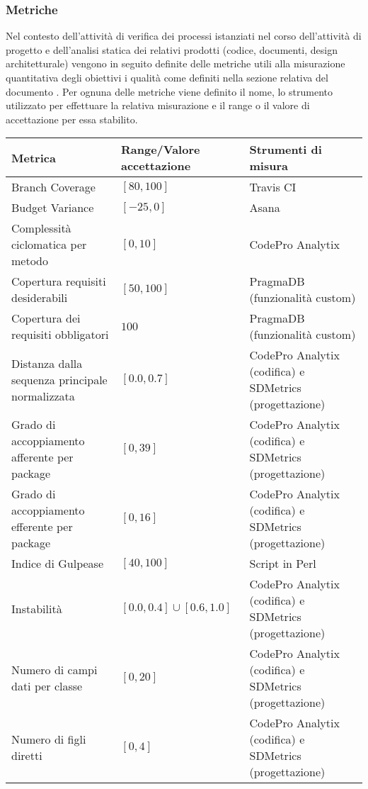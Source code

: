 \subsubsection{Metriche}
	Nel contesto dell'attività di verifica dei processi istanziati nel corso dell'attività di progetto e dell'analisi statica dei relativi prodotti (codice, documenti, design architetturale) vengono in seguito definite delle metriche utili alla misurazione quantitativa degli obiettivi i qualità come definiti nella sezione relativa del documento \PdQ.
	Per ognuna delle metriche viene definito il nome, lo strumento utilizzato per effettuare la relativa misurazione e il range o il valore di accettazione per essa stabilito.
	\begin{longtable}{|p{}|p{}|p{}|}
	\hline 
	\textbf{Metrica} & \textbf{Range/Valore accettazione} & \textbf{Strumenti di misura} \\
	\hline
	\endhead 
	Branch Coverage &  $[80, 100]$ &  Travis CI \\
	\hline 
	Budget Variance &  $[-25, 0]$ &  Asana \\
	\hline 
	Complessità ciclomatica per metodo &  $[0, 10]$ &  CodePro Analytix \\
	\hline 
	Copertura requisiti desiderabili &  $[50, 100]$ & PragmaDB (funzionalità custom) \\
	\hline 
	Copertura dei requisiti obbligatori &  $100$ & PragmaDB (funzionalità custom) \\
	\hline 
	Distanza dalla sequenza principale normalizzata &  $[0.0, 0.7]$ &  CodePro Analytix (codifica) e SDMetrics (progettazione) \\
	\hline 
	Grado di accoppiamento afferente per package &  $[0, 39]$ &  CodePro Analytix (codifica) e SDMetrics (progettazione) \\
	\hline 
	Grado di accoppiamento efferente per package &  $[0, 16]$ &  CodePro Analytix (codifica) e SDMetrics (progettazione) \\
	\hline 
	Indice di Gulpease &  $[40, 100]$ & Script in Perl \\
	\hline 
	Instabilità &  $[0.0, 0.4] \cup [0.6, 1.0]$ &  CodePro Analytix (codifica) e SDMetrics (progettazione) \\
	\hline 
	Numero di campi dati per classe &  $[0, 20]$ &  CodePro Analytix (codifica) e SDMetrics (progettazione) \\
	\hline 
	Numero di figli diretti &  $[0, 4]$ &  CodePro Analytix (codifica) e SDMetrics (progettazione) \\

\end{longtable}

